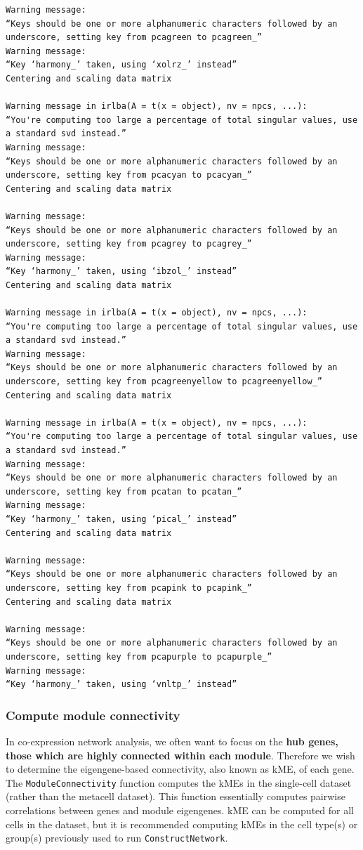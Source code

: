 \documentclass[
  letterpaper,
  DIV=11,
  numbers=noendperiod]{scrartcl}
\begin{document}
\begin{verbatim}
Warning message:
“Keys should be one or more alphanumeric characters followed by an underscore, setting key from pcagreen to pcagreen_”
Warning message:
“Key ‘harmony_’ taken, using ‘xolrz_’ instead”
Centering and scaling data matrix

Warning message in irlba(A = t(x = object), nv = npcs, ...):
“You're computing too large a percentage of total singular values, use a standard svd instead.”
Warning message:
“Keys should be one or more alphanumeric characters followed by an underscore, setting key from pcacyan to pcacyan_”
Centering and scaling data matrix

Warning message:
“Keys should be one or more alphanumeric characters followed by an underscore, setting key from pcagrey to pcagrey_”
Warning message:
“Key ‘harmony_’ taken, using ‘ibzol_’ instead”
Centering and scaling data matrix

Warning message in irlba(A = t(x = object), nv = npcs, ...):
“You're computing too large a percentage of total singular values, use a standard svd instead.”
Warning message:
“Keys should be one or more alphanumeric characters followed by an underscore, setting key from pcagreenyellow to pcagreenyellow_”
Centering and scaling data matrix

Warning message in irlba(A = t(x = object), nv = npcs, ...):
“You're computing too large a percentage of total singular values, use a standard svd instead.”
Warning message:
“Keys should be one or more alphanumeric characters followed by an underscore, setting key from pcatan to pcatan_”
Warning message:
“Key ‘harmony_’ taken, using ‘pical_’ instead”
Centering and scaling data matrix

Warning message:
“Keys should be one or more alphanumeric characters followed by an underscore, setting key from pcapink to pcapink_”
Centering and scaling data matrix

Warning message:
“Keys should be one or more alphanumeric characters followed by an underscore, setting key from pcapurple to pcapurple_”
Warning message:
“Key ‘harmony_’ taken, using ‘vnltp_’ instead”
\end{verbatim}

\subsubsection{Compute module
connectivity}\label{compute-module-connectivity}

In co-expression network analysis, we often want to focus on the
\textbf{hub genes, those which are highly connected within each module}.
Therefore we wish to determine the eigengene-based connectivity, also
known as kME, of each gene. The \texttt{ModuleConnectivity} function
computes the kMEs in the single-cell dataset (rather than the metacell
dataset). This function essentially computes pairwise correlations
between genes and module eigengenes. kME can be computed for all cells
in the dataset, but it is recommended computing kMEs in the cell type(s)
or group(s) previously used to run \texttt{ConstructNetwork}.
\end{document}
